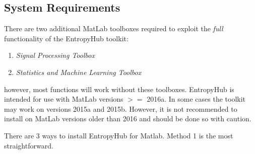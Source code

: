 \documentclass[12pt, a4paper, titlepage, openany]{book}
\begin{document}
\subsection*{\normalsize System Requirements}
\noindent There are two additional MatLab toolboxes required to exploit the \textit{full} functionality of the EntropyHub toolkit: \begin{enumerate}
\item[] \emph{Signal Processing Toolbox}
\item[] \emph{Statistics and Machine Learning Toolbox}
\end{enumerate}  
however, most functions will work without these toolboxes.\newline
EntropyHub is intended for use with MatLab versions $>=$ 2016a.  In some cases the toolkit may work on versions 2015a and 2015b. However, it is not recommended to install on MatLab versions older than 2016 and should be done so with caution.



\noindent There are 3 ways to install EntropyHub for Matlab. Method 1 is the most straightforward.
\end{document}
